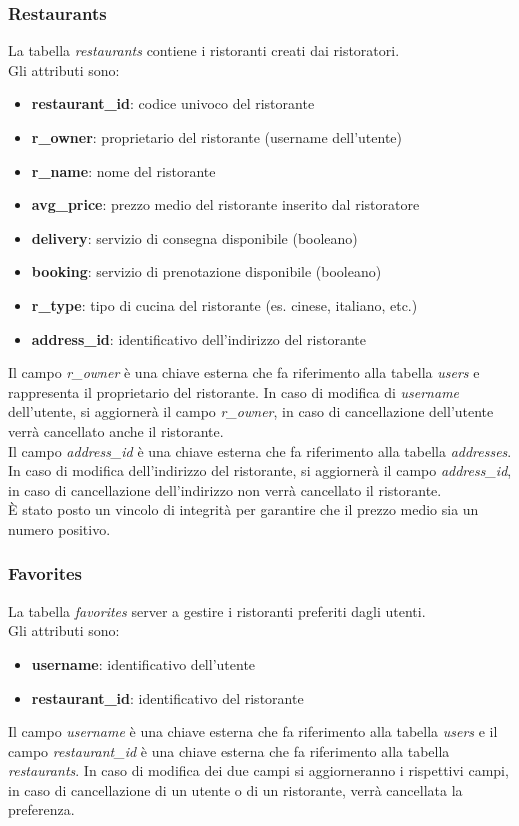 \subsubsection{Restaurants}
\label{sec:restaurants}
La tabella \textit{restaurants} contiene i ristoranti creati 
dai ristoratori.\\
Gli attributi sono:
\begin{itemize}
    \item \textbf{restaurant\_id}: codice univoco del ristorante
    \item \textbf{r\_owner}: proprietario del ristorante (username dell'utente)
    \item \textbf{r\_name}: nome del ristorante
    \item \textbf{avg\_price}: prezzo medio del ristorante inserito dal ristoratore
    \item \textbf{delivery}: servizio di consegna disponibile (booleano)
    \item \textbf{booking}: servizio di prenotazione disponibile (booleano)
    \item \textbf{r\_type}: tipo di cucina del ristorante (es. cinese, italiano, etc.)
    \item \textbf{address\_id}: identificativo dell'indirizzo del ristorante
\end{itemize}
Il campo \textit{r\_owner} è una chiave esterna che fa riferimento
alla tabella \textit{users} e rappresenta il proprietario del ristorante.
In caso di modifica di \textit{username} dell'utente, si aggiornerà
il campo \textit{r\_owner}, in caso di cancellazione dell'utente 
verrà cancellato anche il ristorante.\\
Il campo \textit{address\_id} è una chiave esterna che fa riferimento
alla tabella \textit{addresses}.
In caso di modifica dell'indirizzo del ristorante, si aggiornerà
il campo \textit{address\_id}, in caso di cancellazione dell'indirizzo
non verrà cancellato il ristorante.\\
\`E stato posto un vincolo di integrità per garantire che il
prezzo medio sia un numero positivo.

\subsubsection{Favorites}
\label{sec:favorites}
La tabella \textit{favorites} server a gestire i 
ristoranti preferiti dagli utenti.\\
Gli attributi sono:
\begin{itemize}
    \item \textbf{username}: identificativo dell'utente
    \item \textbf{restaurant\_id}: identificativo del ristorante
\end{itemize}
Il campo \textit{username} è una chiave esterna che fa riferimento
alla tabella \textit{users} e il campo \textit{restaurant\_id} 
è una chiave esterna che fa riferimento
alla tabella \textit{restaurants}. In caso di modifica dei due campi
si aggiorneranno i rispettivi campi, in caso di cancellazione
di un utente o di un ristorante, verrà cancellata la preferenza.

